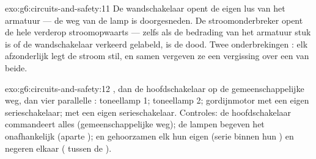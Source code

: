 \begin{solution}{exo:g6:circuits-and-safety:11}
De wandschakelaar opent de eigen lus van het armatuur --- de weg van
de lamp is doorgesneden. De stroomonderbreker opent de hele
 verderop stroomopwaarts --- zelfs als de bedrading van het
armatuur stuk is of de wandschakelaar verkeerd gelabeld, is de
 dood. Twee onderbrekingen : elk afzonderlijk legt de
stroom stil, en samen vergeven ze een vergissing over een van beide.
\end{solution}

\begin{solution}{exo:g6:circuits-and-safety:12}
, dan de hoofdschakelaar op de gemeenschappelijke weg, dan
vier parallelle : toneellamp 1; toneellamp 2;
gordijnmotor met een eigen serieschakelaar;  met een
eigen serieschakelaar. Controles: de hoofdschakelaar commandeert alles
(gemeenschappelijke weg); de lampen begeven het onafhankelijk
(aparte );  en  gehoorzamen elk hun eigen
 (serie binnen hun ) en negeren elkaar (
tussen de ).
\end{solution}

